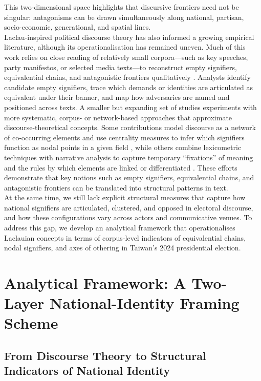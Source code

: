 \documentclass[man,12pt]{apa7}
\begin{document}
This two-dimensional space highlights that discursive frontiers need not be singular: antagonisms can be drawn simultaneously along national, partisan, socio-economic, generational, and spatial lines.\\%
Laclau-inspired political discourse theory has also informed a growing empirical literature, although its operationalisation has remained uneven. 
Much of this work relies on close reading of relatively small corpora—such as key speeches, party manifestos, or selected media texts—to reconstruct empty signifiers, equivalential chains, and antagonistic frontiers qualitatively \parencite{jorgensen2002,stengel2019}. 
Analysts identify candidate empty signifiers, trace which demands or identities are articulated as equivalent under their banner, and map how adversaries are named and positioned across texts. 
A smaller but expanding set of studies experiments with more systematic, corpus- or network-based approaches that approximate discourse-theoretical concepts. 
Some contributions model discourse as a network of co-occurring elements and use centrality measures to infer which signifiers function as nodal points in a given field \parencite{haditaghi2016}, 
while others combine lexicometric techniques with narrative analysis to capture temporary ``fixations'' of meaning and the rules by which elements are linked or differentiated \parencite{felgenhauer2007,glasze2007}. 
These efforts demonstrate that key notions such as empty signifiers, equivalential chains, and antagonistic frontiers can be translated into structural patterns in text.\\%
At the same time, we still lack explicit structural measures that capture how national signifiers are articulated, clustered, and opposed in electoral discourse, 
and how these configurations vary across actors and communicative venues. 
To address this gap, we develop an analytical framework that operationalises Laclauian concepts in terms of corpus-level indicators of equivalential chains, nodal signifiers, and axes of othering in Taiwan's 2024 presidential election.

\section{Analytical Framework: A Two-Layer National-Identity Framing Scheme}
\subsection{From Discourse Theory to Structural Indicators of National Identity}
\end{document}
